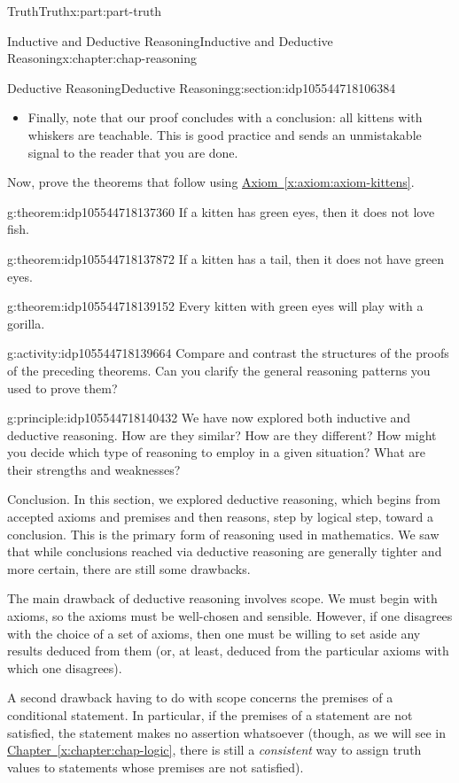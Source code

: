 \documentclass[oneside,10pt,]{book}
\newcommand{\xreffont}{\relax}
\numberwithin{equation}{section}
\begin{document}
\begin{partptx}{Truth}{}{Truth}{}{}{x:part:part-truth}
\begin{chapterptx}{Inductive and Deductive Reasoning}{}{Inductive and Deductive Reasoning}{}{}{x:chapter:chap-reasoning}
\begin{sectionptx}{Deductive Reasoning}{}{Deductive Reasoning}{}{}{g:section:idp105544718106384}
\begin{itemize}[label=\textbullet]
\item{}Finally, note that our proof concludes with a conclusion: all kittens with whiskers are teachable. This is good practice and sends an unmistakable signal to the reader that you are done.%
\end{itemize}
Now, prove the theorems that follow using \hyperref[x:axiom:axiom-kittens]{Axiom~{\xreffont\ref{x:axiom:axiom-kittens}}}.%
\begin{theorem}{}{}{g:theorem:idp105544718137360}%
If a kitten has green eyes, then it does not love fish.%
\end{theorem}
\begin{theorem}{}{}{g:theorem:idp105544718137872}%
If a kitten has a tail, then it does not have green eyes.%
\end{theorem}
\begin{theorem}{}{}{g:theorem:idp105544718139152}%
Every kitten with green eyes will play with a gorilla.%
\end{theorem}
\begin{activity}{}{g:activity:idp105544718139664}%
Compare and contrast the structures of the proofs of the preceding theorems. Can you clarify the general reasoning patterns you used to prove them?%
\end{activity}%
\begin{principle}{}{}{g:principle:idp105544718140432}%
We have now explored both inductive and deductive reasoning. How are they similar? How are they different? How might you decide which type of reasoning to employ in a given situation? What are their strengths and weaknesses?%
\end{principle}
\begin{conclusion}{Conclusion.}%
In this section, we explored deductive reasoning, which begins from accepted axioms and premises and then reasons, step by logical step, toward a conclusion. This is the primary form of reasoning used in mathematics. We saw that while conclusions reached via deductive reasoning are generally tighter and more certain, there are still some drawbacks.%
\par
The main drawback of deductive reasoning involves scope. We must begin with axioms, so the axioms must be well-chosen and sensible. However, if one disagrees with the choice of a set of axioms, then one must be willing to set aside any results deduced from them (or, at least, deduced from the particular axioms with which one disagrees).%
\par
A second drawback having to do with scope concerns the premises of a conditional statement. In particular, if the premises of a statement are not satisfied, the statement makes no assertion whatsoever (though, as we will see in \hyperref[x:chapter:chap-logic]{Chapter~{\xreffont\ref{x:chapter:chap-logic}}}, there is still a \emph{consistent} way to assign truth values to statements whose premises are not satisfied).%

\end{conclusion}
\end{sectionptx}
\end{chapterptx}
\end{partptx}
\end{document}
